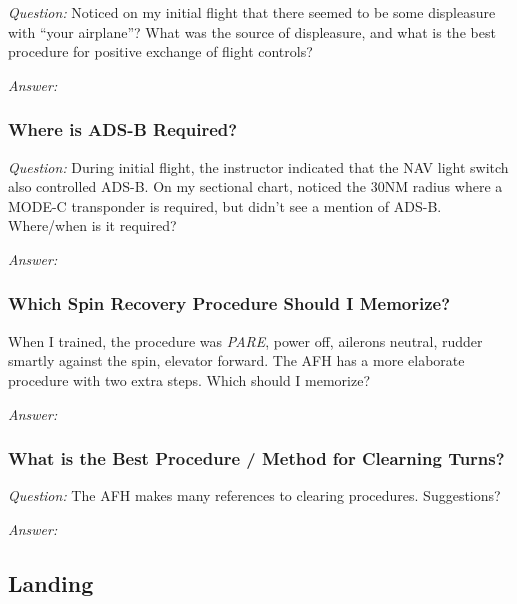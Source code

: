 \documentclass[letterpaper,10pt,titlepage]{article}
\begin{document}
\emph{Question:} Noticed on my initial flight that there seemed to be some
displeasure with ``your airplane''?  What was the source of displeasure, and what
is the best procedure for positive exchange of flight controls?

\noindent{}\emph{Answer:}


\subsubsection{Where is ADS-B Required?}
\label{sqsa0:sfig0:sads0}

\emph{Question:} During initial flight, the instructor indicated that the NAV
light switch also controlled ADS-B.  On my sectional chart, noticed the 30NM
radius where a MODE-C transponder is required, but didn't see a mention of ADS-B.
Where/when is it required?

\noindent{}\emph{Answer:}



\subsubsection{Which Spin Recovery Procedure Should I Memorize?}
\label{sqsa0:sfig0:swsr0}

When I trained, the procedure was \emph{PARE}, power off, ailerons neutral,
rudder smartly against the spin, elevator forward.  The AFH has a more elaborate
procedure with two extra steps.  Which should I memorize?

\noindent{}\emph{Answer:}



\subsubsection{What is the Best Procedure / Method for Clearning Turns?}
\label{sqsa0:sfig0:sclt0}

\emph{Question:} The AFH makes many references to clearing procedures.  Suggestions?

\noindent{}\emph{Answer:}


\subsection{Landing}
\label{sqsa0:slnd0}
\end{document}
